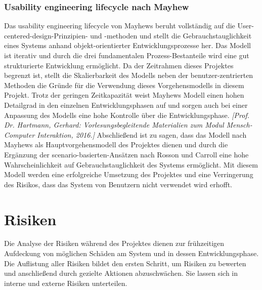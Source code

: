 \documentclass[a4paper,11pt]{article}%
\renewcommand{\\}{\vspace*{0.5\baselineskip} \newline}
\begin{document}
		\subsubsection{Usability engineering lifecycle nach Mayhew}
			Das usability engineering lifecycle von Mayhews beruht vollständig auf die User-centered-design-Prinzipien- und -methoden und stellt die Gebrauchstauglichkeit eines Systems anhand objekt-orientierter Entwicklungsprozesse her. Das Modell ist iterativ und durch die drei fundamentalen Prozess-Bestanteile wird eine gut strukturierte Entwicklung ermöglicht. Da der Zeitrahmen dieses Projektes begrenzt ist, stellt die Skalierbarkeit des Modells neben der benutzer-zentrierten Methoden die Gründe für die Verwendung dieses Vorgehensmodells in diesem Projekt. Trotz der geringen Zeitkapazität weist Mayhews Modell einen hohen Detailgrad in den einzelnen Entwicklungsphasen auf und sorgen auch bei einer Anpassung des Modells eine hohe Kontrolle über die Entwicklungsphase. \emph{[Prof. Dr. Hartmann, Gerhard: Vorlesungsbegleitende Materialien zum Modul Mensch-Computer Interaktion, 2016.]}\\
			Abschließend ist zu sagen, dass das Modell nach Mayhews als Hauptvorgehensmodell des Projektes dienen und durch die Ergänzung der scenario-basierten-Ansätzen nach Rosson und Carroll eine hohe Wahrscheinlichkeit auf Gebrauchstauglichkeit des Systems ermöglicht. Mit diesem Modell werden eine erfolgreiche Umsetzung des Projektes und eine Verringerung des Risikos, dass das System von Benutzern nicht verwendet wird erhofft.

\newpage

\section{Risiken}
	Die Analyse der Risiken während des Projektes dienen zur frühzeitigen Aufdeckung von möglichen Schäden am System und in dessen Entwicklungsphase. Die Auflistung aller Risiken bildet den ersten Schritt, um Risiken zu bewerten und anschließend durch gezielte Aktionen abzuschwächen. Sie lassen sich in interne und externe Risiken unterteilen.
\end{document}
